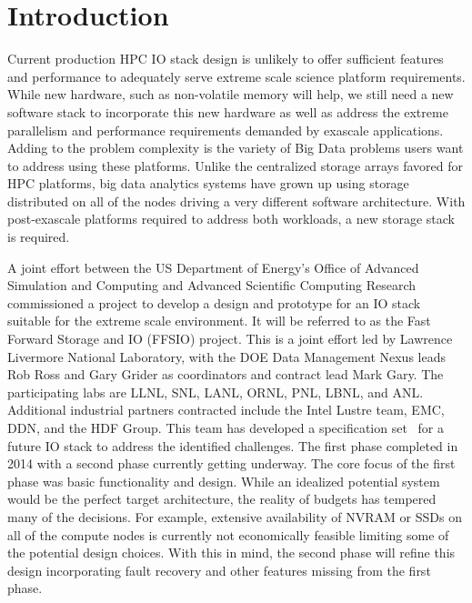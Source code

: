 \documentclass[conference]{IEEEtran} \pdfpagewidth=8.5in
\begin{document}

\section{Introduction}

Current production HPC IO stack design is unlikely to offer sufficient features
and performance to adequately serve extreme scale science platform
requirements.  While new hardware, such as non-volatile memory will help, we
still need a new software stack to incorporate this new hardware as well as
address the extreme parallelism and performance requirements demanded by
exascale applications. Adding to the problem complexity is the variety of Big
Data problems users want to address using these platforms. Unlike the
centralized storage arrays favored for HPC platforms, big data analytics
systems have grown up using storage distributed on all of the nodes driving a
very different software architecture. With post-exascale platforms required to
address both workloads, a new storage stack is required.

A joint effort between the US Department of
Energy's Office of Advanced Simulation and Computing and Advanced Scientific
Computing Research commissioned a project to develop a design and prototype for
an IO stack suitable for the extreme scale environment. It will be referred to
as the Fast Forward Storage and IO (FFSIO) project. This is a joint effort led
by Lawrence Livermore National Laboratory, with the DOE Data Management Nexus
leads Rob Ross and Gary Grider as coordinators and contract lead Mark Gary. The
participating labs are LLNL, SNL, LANL, ORNL, PNL, LBNL, and ANL.  Additional
industrial partners contracted include the Intel Lustre team, EMC, DDN, and the
HDF Group. This team has developed a specification
set~\cite{fastforward:2014:docs} for a future IO stack to address the
identified challenges. The first phase completed in 2014 with a second phase
currently getting underway. The core focus of the first phase was basic
functionality and design. While an idealized potential system would be the
perfect target architecture, the reality of budgets has tempered many of the
decisions. For example, extensive availability of NVRAM or SSDs on all of the
compute nodes is currently not economically feasible limiting some of the
potential design choices.  With this in mind, the second phase will refine this
design incorporating fault recovery and other features missing from the first
phase.
\end{document}
